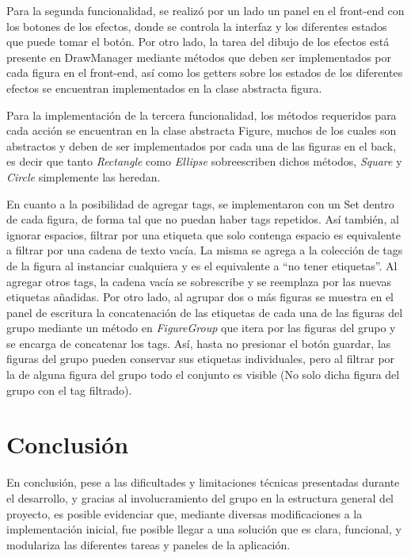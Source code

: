 \documentclass[12pt]{article}
\begin{document}
Para la segunda funcionalidad, se realizó por un lado un panel en el front-end con los botones de los efectos, donde se controla la interfaz y los diferentes estados que puede tomar el botón. Por otro lado, la tarea del dibujo de los efectos está presente en DrawManager mediante métodos que deben ser implementados por cada figura en el front-end, así como los getters sobre los estados de los diferentes efectos se encuentran implementados en la clase abstracta figura.

Para la implementación de la tercera funcionalidad, los métodos requeridos para cada acción se encuentran en la clase abstracta Figure, muchos de los cuales son abstractos y deben de ser implementados  por cada una de las figuras en el back, es decir que tanto \textit{Rectangle} como \textit{Ellipse} sobreescriben dichos métodos, \textit{Square} y \textit{Circle} simplemente las heredan.

En cuanto a la posibilidad de agregar tags, se implementaron con un Set dentro de cada figura, de forma tal que no puedan haber tags repetidos. Así también, al ignorar espacios, filtrar por una etiqueta que solo contenga espacio es equivalente a filtrar por una cadena de texto vacía. La misma se agrega a la colección de tags de la figura al instanciar cualquiera y es el equivalente a “no tener etiquetas”. Al agregar otros tags, la cadena vacía se sobrescribe y se reemplaza por las nuevas etiquetas añadidas. Por otro lado, al agrupar dos o más figuras se muestra en el panel de escritura la concatenación de las etiquetas de cada una de las figuras del grupo mediante un método en \textit{FigureGroup} que itera por las figuras del grupo y se encarga de concatenar los tags. Así, hasta no presionar el botón guardar, las figuras del grupo pueden conservar sus etiquetas individuales, pero al filtrar por la de alguna figura del grupo todo el conjunto es visible (No solo dicha figura del grupo con el tag filtrado).

\section* {Conclusión}

En conclusión, pese a las dificultades y limitaciones técnicas presentadas durante el desarrollo, y gracias al involucramiento del grupo en la estructura general del proyecto, es posible evidenciar que, mediante diversas modificaciones a la implementación inicial, fue posible llegar a una solución que es clara, funcional, y modulariza las diferentes tareas y paneles de la aplicación.
\end{document}
